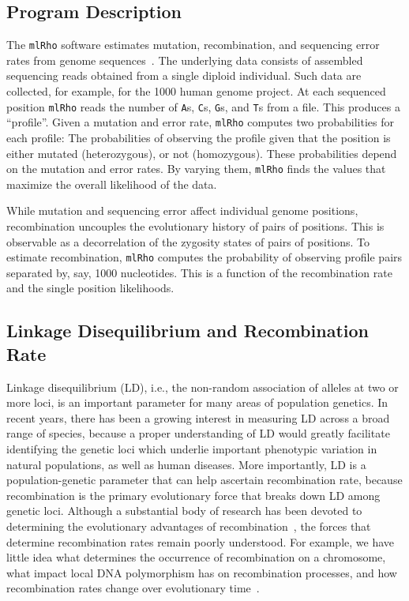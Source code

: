 \documentclass{sig-alternate}
\newcommand{\ty}{\texttt}
\begin{document}
\subsection{Program Description}
The \texttt{mlRho} software estimates mutation, recombination, and sequencing error rates from genome
sequences~\cite{MEC:MEC4482}. The underlying data consists of assembled sequencing reads obtained from a
single diploid individual. Such data are collected, for example, for the 1000 human genome project. At each
sequenced position \texttt{mlRho} reads the number of \ty{A}s, \ty{C}s, \ty{G}s, and \ty{T}s from a file. This
produces a ``profile''. Given a mutation and error rate, \texttt{mlRho} computes two probabilities for each
profile: The probabilities of observing the profile given that the position is either mutated (heterozygous),
or not (homozygous). These probabilities depend on the mutation and error rates. By varying them,
\texttt{mlRho} finds the values that maximize the overall likelihood of the data.

While mutation and sequencing error affect individual genome positions, recombination uncouples the
evolutionary history of pairs of positions. This is observable as a decorrelation of the zygosity states of
pairs of positions. To estimate recombination, \texttt{mlRho} computes the probability of observing profile pairs
separated by, say, 1000 nucleotides. This is a function of the recombination rate and the single position
likelihoods.

\subsection{Linkage Disequilibrium and Recombination Rate}\label{sec:LD}
Linkage disequilibrium (LD), i.e., the non-random association of alleles at two or more loci, is an important
parameter for many areas of population genetics.  In recent years, there has been a growing interest in
measuring LD across a broad range of species, because a proper understanding of LD would greatly facilitate
identifying the genetic loci which underlie important phenotypic variation in natural populations, as well as
human diseases. More importantly, LD is a population-genetic parameter that can help ascertain recombination
rate, because recombination is the primary evolutionary force that breaks down LD among genetic loci. Although
a substantial body of research has been devoted to determining the evolutionary advantages of
recombination~\cite{resolving-paradox}, the forces that determine recombination rates remain poorly
understood. For example, we have little idea what determines the occurrence of recombination on a chromosome,
what impact local DNA polymorphism has on recombination processes, and how recombination rates change over
evolutionary time~\cite{stumpf}.
\end{document}
